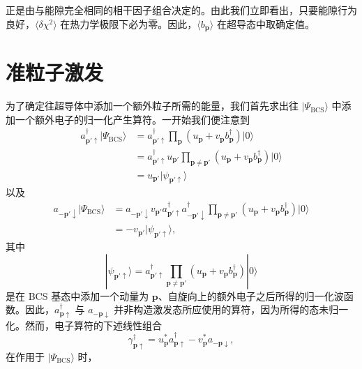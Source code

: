 正是由与能隙完全相同的相干因子组合决定的。由此我们立即看出，只要能隙行为良好，$\langle\delta\chi^{2}\rangle$ 在热力学极限下必为零。因此，$\langle b_{\mathbf{p}}\rangle$ 在超导态中取确定值。

\section{准粒子激发}

为了确定往超导体中添加一个额外粒子所需的能量，我们首先求出往 $|\Psi_{\mathrm{BCS}}\rangle$ 中添加一个额外电子的归一化产生算符。一开始我们便注意到
\begin{align*}
a_{\mathbf{p}'\uparrow}^{\dagger}|\Psi_{\mathrm{BCS}}\rangle&=a_{\mathbf{p}'\uparrow}^{\dagger}\prod_{\mathbf{p}}\left(u_{\mathbf{p}}+v_{\mathbf{p}}b_{\mathbf{p}}^{\dagger}\right)|0\rangle\\
&=a_{\mathbf{p}'\uparrow}^{\dagger}u_{\mathbf{p}'}\prod_{\mathbf{p}\neq\mathbf{p}'}\left(u_{\mathbf{p}}+v_{\mathbf{p}}b_{\mathbf{p}}^{\dagger}\right)|0\rangle\\
&=u_{\mathbf{p}'}|\psi_{\mathbf{p}'\uparrow}\rangle\tag{12.217}
\end{align*}
以及
\begin{align*}
a_{-\mathbf{p}'\downarrow}|\Psi_{\mathrm{BCS}}\rangle&=a_{-\mathbf{p}'\downarrow}v_{\mathbf{p}'}a_{\mathbf{p}'\uparrow}^{\dagger}a_{-\mathbf{p}'\downarrow}^{\dagger}\prod_{\mathbf{p}\neq\mathbf{p}'}\left(u_{\mathbf{p}}+v_{\mathbf{p}}b_{\mathbf{p}}^{\dagger}\right)|0\rangle\\
&=-v_{\mathbf{p}'}|\psi_{\mathbf{p}'\uparrow}\rangle,\tag{12.218}
\end{align*}
其中
\begin{equation*}
|\psi_{\mathbf{p}'\uparrow}\rangle=a_{\mathbf{p}'\uparrow}^{\dagger}\prod_{\mathbf{p}\neq\mathbf{p}'}\left(u_{\mathbf{p}}+v_{\mathbf{p}}b_{\mathbf{p}}^{\dagger}\right)|0\rangle\tag{12.219}
\end{equation*}
是在 BCS 基态中添加一个动量为 $\mathbf{p}$、自旋向上的额外电子之后所得的归一化波函数。因此，$a_{\mathbf{p}\uparrow}^{\dagger}$ 与 $a_{-\mathbf{p}\downarrow}$ 并非构造激发态所应使用的算符，因为所得的态未归一化。然而，电子算符的下述线性组合
\begin{equation*}
\gamma_{\mathbf{p}\uparrow}^{\dagger}=u_{\mathbf{p}}^{*}a_{\mathbf{p}\uparrow}^{\dagger}-v_{\mathbf{p}}^{*}a_{-\mathbf{p}\downarrow},\tag{12.220}
\end{equation*}
在作用于 $|\Psi_{\mathrm{BCS}}\rangle$ 时，
